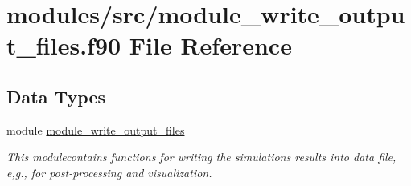 \hypertarget{module__write__output__files_8f90}{
\section{modules/src/module\-\_\-write\-\_\-output\-\_\-files.f90 \-File \-Reference}
\label{module__write__output__files_8f90}
}
\subsection*{\-Data \-Types}
\begin{DoxyCompactItemize}
\item 
module \hyperlink{classmodule__write__output__files}{module\-\_\-write\-\_\-output\-\_\-files}
\begin{DoxyCompactList}\small\item\em \-This modulecontains functions for writing the simulations results into data file, e,g., for post-\/processing and visualization. \end{DoxyCompactList}\end{DoxyCompactItemize}
